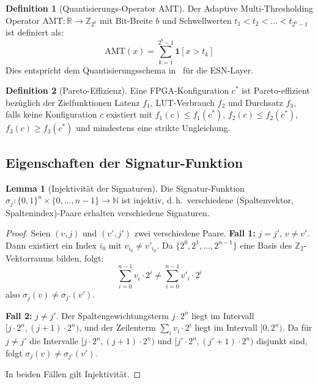 ﻿\documentclass[a4paper,12pt]{article}
\theoremstyle{definition}
\newtheorem{definition}{Definition}
\newtheorem{lemma}{Lemma}
\begin{document}
\begin{definition}[Quantisierungs-Operator AMT]
    Der Adaptive Multi-Thresholding Operator $\text{AMT}: \mathbb{R} \to \mathbb{Z}_{2^b}$
    mit Bit-Breite $b$ und Schwellwerten $t_1 < t_2 < \ldots < t_{2^b - 1}$ ist definiert als:
    \[
        \text{AMT}(x) = \sum_{k=1}^{2^b - 1} \mathbf{1}[x > t_k]
    \]
    Dies entspricht dem Quantisierungsschema in~\cite{jafari2025} für die ESN-Layer.
\end{definition}

\begin{definition}[Pareto-Effizienz]
    Eine FPGA-Konfiguration $c^*$ ist Pareto-effizient bezüglich der Zielfunktionen
    Latenz $f_1$, LUT-Verbrauch $f_2$ und Durchsatz $f_3$, falls keine Konfiguration $c$
    existiert mit $f_1(c) \leq f_1(c^*)$, $f_2(c) \leq f_2(c^*)$, $f_3(c) \geq f_3(c^*)$
    und mindestens eine strikte Ungleichung.
\end{definition}

\subsection{Eigenschaften der Signatur-Funktion}

\begin{lemma}[Injektivität der Signaturen]
\label{lem:injektiv}
    Die Signatur-Funktion $\sigma_j: \{0,1\}^n \times \{0,\ldots,n-1\} \to \mathbb{N}$
    ist injektiv, d.\,h.\ verschiedene (Spaltenvektor, Spaltenindex)-Paare erhalten
    verschiedene Signaturen.
\end{lemma}

\begin{proof}
    Seien $(v, j)$ und $(v', j')$ zwei verschiedene Paare.
    \textbf{Fall 1:} $j = j'$, $v \neq v'$. Dann existiert ein Index $i_0$ mit $v_{i_0} \neq v'_{i_0}$.
    Da $\{2^0, 2^1, \ldots, 2^{n-1}\}$ eine Basis des $\mathbb{Z}_2$-Vektorraums bilden, folgt:
    \[
        \sum_{i=0}^{n-1} v_i \cdot 2^i \neq \sum_{i=0}^{n-1} v'_i \cdot 2^i
    \]
    also $\sigma_j(v) \neq \sigma_{j'}(v')$.
    
    \textbf{Fall 2:} $j \neq j'$. Der Spaltengewichtungsterm $j \cdot 2^n$ liegt im Intervall
    $[j \cdot 2^n, (j+1) \cdot 2^n)$, und der Zeilenterm $\sum_{i} v_i \cdot 2^i$ liegt im Intervall
    $[0, 2^n)$. Da für $j \neq j'$ die Intervalle $[j \cdot 2^n, (j+1) \cdot 2^n)$ und
    $[j' \cdot 2^n, (j'+1) \cdot 2^n)$ disjunkt sind, folgt $\sigma_j(v) \neq \sigma_{j'}(v')$.
    
    In beiden Fällen gilt Injektivität.
\end{proof}
\end{document}
